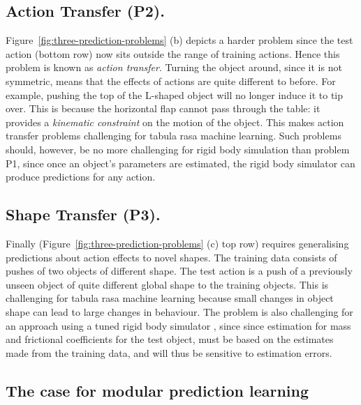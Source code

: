 \subsection{Action Transfer (P2).} Figure~\ref{fig:three-prediction-problems} (b) depicts a harder problem since the test action (bottom row) now sits outside the range of training actions. Hence this problem is known as {\em action transfer}. Turning the object around, since it is not symmetric, means that the effects of actions are quite different to before. For example, pushing the top of the L-shaped object will no longer induce it to tip over. This is because the horizontal flap cannot pass through the table: it provides a {\em kinematic constraint} on the motion of the object. This makes action transfer problems challenging for tabula rasa machine learning. Such problems should, however, be no more challenging for rigid body simulation than problem P1, since once an object's parameters are estimated, the rigid body simulator can produce predictions for any action.

\subsection{Shape Transfer (P3).} Finally (Figure~\ref{fig:three-prediction-problems} (c) top row) requires generalising predictions about action effects to novel shapes. The training data consists of pushes of two objects of different shape. The test action is a push of a previously unseen object of quite different global shape to the training objects. This is challenging for tabula rasa machine learning because small changes in object shape can lead to large changes in behaviour. The problem is also challenging for an approach using a tuned rigid body simulator , since since estimation for mass and frictional coefficients for the test object, must be based on the estimates made from the training data, and will thus be sensitive to estimation errors.

\subsection{The case for modular prediction learning}

